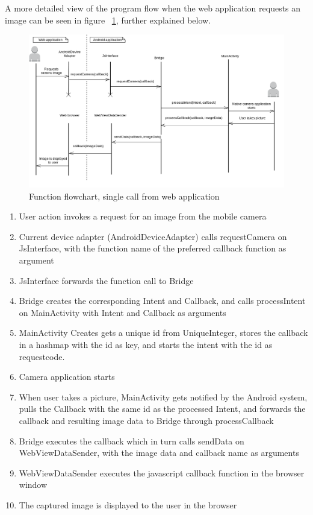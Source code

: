 A more detailed view of the program flow when the web application requests an image can be seen in figure ~\ref{fig:nativeflow}, further explained below.
\begin{figure}[h!]
	\centering
    \includegraphics[width=120mm,natwidth=800,natheight=600]{./img/androidfunctionflow.png}
    \caption{Function flowchart, single call from web application}
    \label{fig:nativeflow}
\end{figure}
\begin{enumerate}
	\item User action invokes a request for an image from the mobile camera
	\item Current device adapter (AndroidDeviceAdapter) calls requestCamera on JsInterface, with the function name of the preferred callback function as argument
	\item JsInterface forwards the function call to Bridge
	\item Bridge creates the corresponding Intent and Callback, and calls processIntent on MainActivity with Intent and Callback as arguments
	\item MainActivity Creates gets a unique id from UniqueInteger, stores the callback in a hashmap with the id as key, and starts the intent with the id as requestcode.
	\item Camera application starts
	\item When user takes a picture, MainActivity gets notified by the Android system, pulls the Callback with the same id as the processed Intent, and forwards the callback and resulting image data to Bridge through processCallback
	\item Bridge executes the callback which in turn calls sendData on WebViewDataSender, with the image data and callback name as arguments
	\item WebViewDataSender executes the javascript callback function in the browser window
	\item The captured image is displayed to the user in the browser
\end{enumerate}

